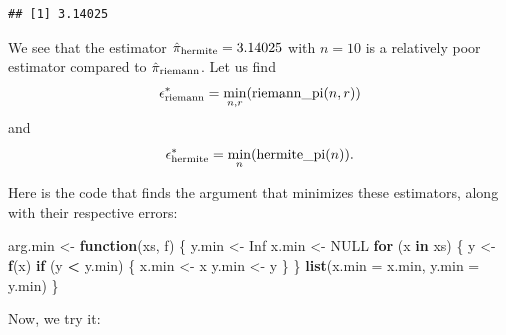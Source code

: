 \documentclass[
  12pt,
]{paper}
\newenvironment{Shaded}{\begin{snugshade}}{\end{snugshade}}
\newcommand{\AttributeTok}[1]{\textcolor[rgb]{0.13,0.29,0.53}{#1}}
\newcommand{\ConstantTok}[1]{\textcolor[rgb]{0.56,0.35,0.01}{#1}}
\newcommand{\ControlFlowTok}[1]{\textcolor[rgb]{0.13,0.29,0.53}{\textbf{#1}}}
\newcommand{\FunctionTok}[1]{\textcolor[rgb]{0.13,0.29,0.53}{\textbf{#1}}}
\newcommand{\NormalTok}[1]{#1}
\newcommand{\OtherTok}[1]{\textcolor[rgb]{0.56,0.35,0.01}{#1}}
\newcommand{\SpecialCharTok}[1]{\textcolor[rgb]{0.81,0.36,0.00}{\textbf{#1}}}
\begin{document}
\begin{verbatim}
## [1] 3.14025
\end{verbatim}

We see that the estimator \(\hat{\pi}_{\rm{hermite}} = 3.14025\) with
\(n=10\) is a relatively poor estimator compared to
\(\hat{\pi}_{\rm{riemann}}\). Let us find \[
  \epsilon^*_{\rm{riemann}} = \min_{n,r}(\operatorname{riemann\_pi}(n,r))
\] and \[
  \epsilon^*_{\rm{hermite}} = \min_{n}(\operatorname{hermite\_pi}(n)).
\]

Here is the code that finds the argument that minimizes these
estimators, along with their respective errors:

\begin{Shaded}
\begin{Highlighting}[]
\NormalTok{arg.min }\OtherTok{\textless{}{-}} \ControlFlowTok{function}\NormalTok{(xs, f) \{}
\NormalTok{    y.min }\OtherTok{\textless{}{-}} \ConstantTok{Inf}
\NormalTok{    x.min }\OtherTok{\textless{}{-}} \ConstantTok{NULL}
    \ControlFlowTok{for}\NormalTok{ (x }\ControlFlowTok{in}\NormalTok{ xs) \{}
\NormalTok{        y }\OtherTok{\textless{}{-}} \FunctionTok{f}\NormalTok{(x)}
        \ControlFlowTok{if}\NormalTok{ (y }\SpecialCharTok{\textless{}}\NormalTok{ y.min) \{}
\NormalTok{            x.min }\OtherTok{\textless{}{-}}\NormalTok{ x}
\NormalTok{            y.min }\OtherTok{\textless{}{-}}\NormalTok{ y}
\NormalTok{        \}}
\NormalTok{    \}}
    \FunctionTok{list}\NormalTok{(}\AttributeTok{x.min =}\NormalTok{ x.min, }\AttributeTok{y.min =}\NormalTok{ y.min)}
\NormalTok{\}}
\end{Highlighting}
\end{Shaded}

Now, we try it:
\end{document}
